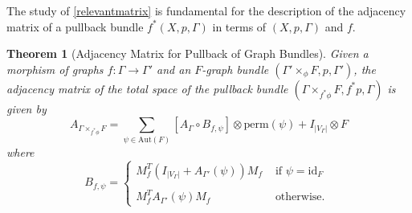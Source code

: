 \documentclass{amsart}
\newtheorem{thm}[theo]{Theorem}
\theoremstyle{definition}
\numberwithin{equation}{section}
\begin{document}
The study of \eqref{relevantmatrix} is fundamental for the description of the adjacency matrix of a pullback bundle $f^*(X,p,\Gamma)$ in terms of $(X, p, \Gamma)$ and $f$.
\begin{thm}[Adjacency Matrix for Pullback of Graph Bundles]\label{1stmaintheorem}
Given a morphism of graphs $f: \Gamma \longrightarrow \Gamma'$ and  an $F$-graph bundle $(\Gamma' \times_\phi F, p, \Gamma')$, the adjacency matrix of the total space of the pullback bundle $(\Gamma \times_{f^*\phi} F, f^*p, \Gamma)$ is given by 
\begin{equation}\label{agammasupersuperextra}
A_{\Gamma \times_{f^*\phi} F}    = \sum\limits_{\psi \in \mathrm{Aut}(F)} [A_{\Gamma} \circ B_{f,\psi}] \otimes \mathrm{perm}(\psi) + I_{\vert V_\Gamma\vert} \otimes F
\end{equation}
where 
\begin{equation}
B_{f,\psi} =\begin{cases}
M_f^T(I_{\vert V_\Gamma\vert } + A_{\Gamma'}(\psi))M_f &\mbox{ if } \psi = \mathrm{id}_F\\
\\
M_f^TA_{\Gamma'}(\psi)M_f &\mbox{ otherwise. }
\end{cases}
\end{equation}
\end{thm}
\end{document}

